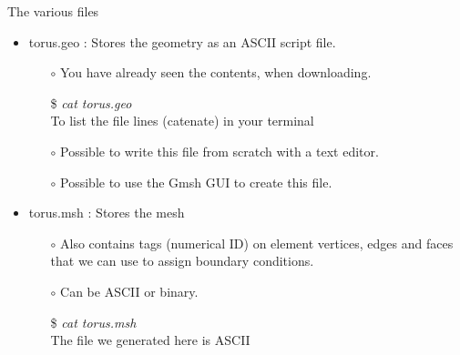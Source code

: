 \documentclass[t]{beamer}
\begin{document}
\begin{frame}{The various files}
   \begin{itemize}
      \item torus.geo : Stores the geometry as an ASCII script file.
      \begin{itemize}
         \item[$\circ$] You have already seen the contents, when downloading.
         \item[\$] \emph{cat torus.geo} \\ \hspace{10pt} To list the file lines (catenate) in your terminal
         \item[$\circ$] Possible to write this file from scratch with a text editor.
         \item[$\circ$] Possible to use the Gmsh GUI to create this file.
      \end{itemize}\vspace{10pt}
      \item torus.msh : Stores the mesh
      \begin{itemize}
         \item[$\circ$] Also contains tags (numerical ID) on element vertices, edges and faces that we can use to assign boundary conditions.
         \item[$\circ$] Can be ASCII or binary.
         \item[\$] \emph{cat torus.msh} \\ \hspace{10pt} The file we generated here is ASCII
      \end{itemize}
   \end{itemize}
\end{frame}
\end{document}
